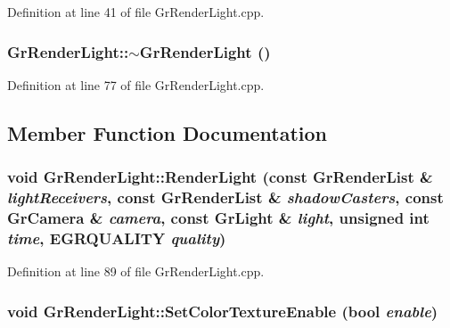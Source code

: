 Definition at line 41 of file GrRenderLight.cpp.\hypertarget{class_gr_render_light_a40834d7c8455b570eefea6518bd8254}{
\subsubsection[{$\sim$GrRenderLight}]{\setlength{\rightskip}{0pt plus 5cm}GrRenderLight::$\sim$GrRenderLight ()}}
\label{class_gr_render_light_a40834d7c8455b570eefea6518bd8254}




Definition at line 77 of file GrRenderLight.cpp.

\subsection{Member Function Documentation}
\hypertarget{class_gr_render_light_ea1e59d002ca4e91abd8a27bbeaf6f4d}{
\subsubsection[{RenderLight}]{\setlength{\rightskip}{0pt plus 5cm}void GrRenderLight::RenderLight (const {\bf GrRenderList} \& {\em lightReceivers}, \/  const {\bf GrRenderList} \& {\em shadowCasters}, \/  const {\bf GrCamera} \& {\em camera}, \/  const {\bf GrLight} \& {\em light}, \/  unsigned int {\em time}, \/  {\bf EGRQUALITY} {\em quality})}}
\label{class_gr_render_light_ea1e59d002ca4e91abd8a27bbeaf6f4d}




Definition at line 89 of file GrRenderLight.cpp.\hypertarget{class_gr_render_light_96e77ad600ecdd3d4db377909457af20}{
\subsubsection[{SetColorTextureEnable}]{\setlength{\rightskip}{0pt plus 5cm}void GrRenderLight::SetColorTextureEnable (bool {\em enable})}}
\label{class_gr_render_light_96e77ad600ecdd3d4db377909457af20}




